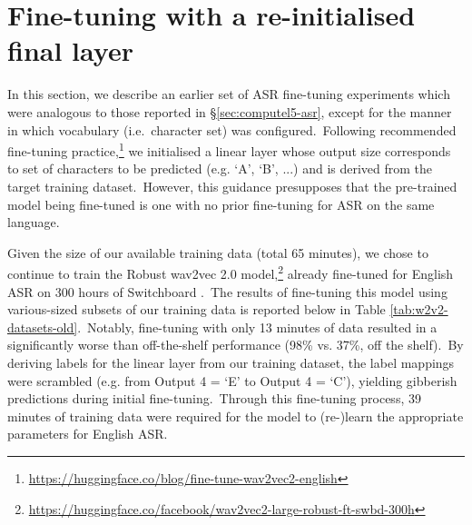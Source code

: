\documentclass{report}
\begin{document}






\appendix
\chapter{Fine-tuning with a re-initialised final layer}
\label{sec:appendix}

In this section, we describe an earlier set of ASR fine-tuning experiments which were analogous to those reported in §\ref{sec:computel5-asr}, except for the manner in which vocabulary (i.e.~character set) was configured.~Following recommended fine-tuning practice,\footnote{\url{https://huggingface.co/blog/fine-tune-wav2vec2-english}} we initialised a linear layer whose output size corresponds to set of characters to be predicted (e.g. `A', `B', ...) and is derived from the target training dataset.~However, this guidance presupposes that the pre-trained model being fine-tuned is one with no prior fine-tuning for ASR on the same language.

Given the size of our available training data (total 65 minutes), we chose to continue to train the Robust wav2vec 2.0 model,\footnote{\url{https://huggingface.co/facebook/wav2vec2-large-robust-ft-swbd-300h}} already fine-tuned for English ASR on 300 hours of Switchboard \parencite{godfrey1992switchboard}.~The results of fine-tuning this model using various-sized subsets of our training data is reported below in Table \ref{tab:w2v2-datasets-old}.~Notably, fine-tuning with only 13 minutes of data resulted in a significantly worse than off-the-shelf performance (98\% vs. 37\%, off the shelf).~By deriving labels for the linear layer from our training dataset, the label mappings were scrambled (e.g. from Output 4 = `E' to Output 4 = `C'), yielding gibberish predictions during initial fine-tuning.~Through this fine-tuning process, 39 minutes of training data were required for the model to (re-)learn the appropriate parameters for English ASR.
\end{document}

